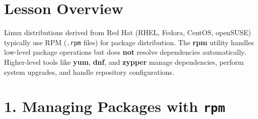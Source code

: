 \documentclass[12pt,a4paper]{report}
\begin{document}
\section*{Lesson Overview}

Linux distributions derived from Red Hat (RHEL, Fedora, CentOS, openSUSE) typically use RPM (\texttt{.rpm} files) for package distribution. The \textbf{rpm} utility handles low-level package operations but does \textbf{not} resolve dependencies automatically. Higher-level tools like \textbf{yum}, \textbf{dnf}, and \textbf{zypper} manage dependencies, perform system upgrades, and handle repository configurations.

\section*{1. Managing Packages with \texttt{rpm}}
\end{document}
